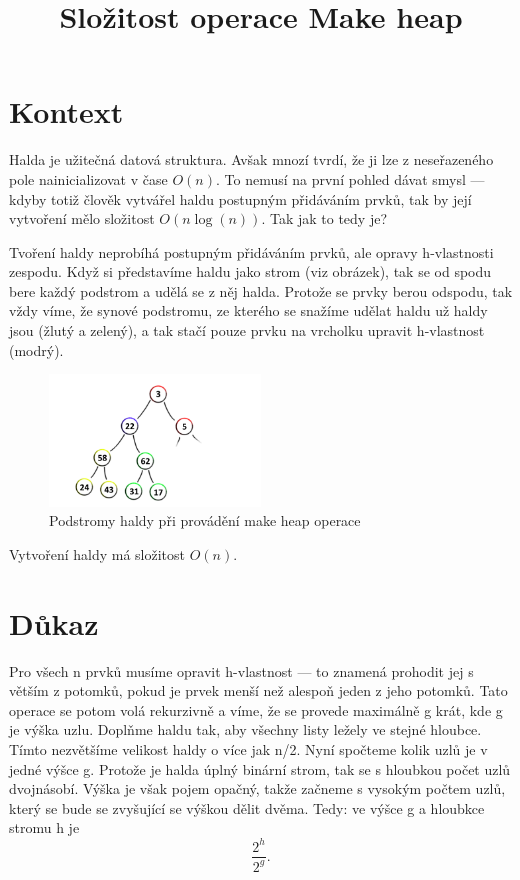 \documentclass{article}
\begin{document}
\title{Složitost operace Make heap}
\date{}
\maketitle

\section{Kontext}

Halda je užitečná datová struktura. Avšak mnozí tvrdí, že ji lze z neseřazeného pole nainicializovat v čase $O(n)$.
To nemusí na první pohled dávat smysl --- kdyby totiž člověk vytvářel haldu postupným přidáváním prvků, tak by její vytvoření mělo složitost $O(n \log(n))$.
Tak jak to tedy je?

Tvoření haldy neprobíhá postupným přidáváním prvků, ale opravy h-vlastnosti zespodu.
Když si představíme haldu jako strom (viz obrázek), tak se od spodu bere každý podstrom a udělá se z něj halda.
Protože se prvky berou odspodu, tak vždy víme, že synové podstromu, ze kterého se snažíme udělat haldu už haldy jsou (žlutý a zelený), a tak stačí pouze prvku na vrcholku upravit h-vlastnost (modrý).

\begin{figure}
    \centering
    \includegraphics[width=0.5\textwidth]{make_heap.png}
    \caption{Podstromy haldy při provádění make heap operace}%
\end{figure}

\begin{theorem}
Vytvoření haldy má složitost $O(n)$.
\end{theorem}

\section{Důkaz}
Pro všech n prvků musíme opravit h-vlastnost --- to znamená prohodit jej s větším z potomků, pokud je prvek menší než alespoň jeden z jeho potomků.
Tato operace se potom volá rekurzivně a víme, že se provede maximálně g krát, kde g je výška uzlu.
Doplňme haldu tak, aby všechny listy ležely ve stejné hloubce.
Tímto nezvětšíme velikost haldy o více jak n/2.
Nyní spočteme kolik uzlů je v jedné výšce g.
Protože je halda úplný binární strom, tak se s hloubkou počet uzlů dvojnásobí.
Výška je však pojem opačný, takže začneme s vysokým počtem uzlů, který se bude se zvyšující se výškou dělit dvěma.
Tedy: ve výšce g a hloubkce stromu h je \[
    \frac{2^h}{2^g}.
\]
\end{document}
